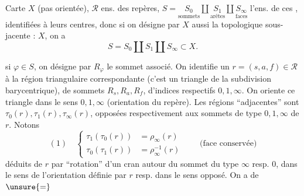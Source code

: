 
Carte $X$ (pas orientée), $\mathcal R$ ens. des repères,
$S=\underset{\text{sommets}}{S_0}\amalg\underset{\text{arêtes}}{S_1}\amalg\underset{\text{faces}}{S_\infty}$
l'ens. de ces , identifiées à  leurs centres, donc si on désigne par $X$ aussi la  topologique sous-jacente : $X$, on a
\[
 S=S_0\amalg S_1\amalg S_\infty\subset X.
\]

si $\varphi\in S$, on désigne par $R_\varphi$ le sommet associé. On identifie un $r=(s,a,f)\in\mathcal R$ à la région triangulaire correspondante (c'est un triangle de la subdivision barycentrique), de sommets $R_s,R_a,R_f$, d'indices respectifs $0,1,\infty$. On oriente ce triangle dans le sens $0,1,\infty$ (orientation du repère). Les régions ``adjacentes'' sont $\tau_0(r),\tau_1(r),\tau_\infty(r)$, opposées respectivement aux sommets de type $0,1,\infty$ de $r$. Notons
\[
 (1)\quad
 \left\{\begin{aligned}
 \tau_1(\tau_0(r))&=\rho_\infty(r)\\
 \tau_0(\tau_1(r))&=\rho_\infty^{-1}(r)
 \end{aligned}\right.
 \qquad\text{(face conservée)}
\]
déduits de $r$ par ``rotation'' d'un cran autour du sommet du type $\infty$ resp. $0$, dans le sens  de l'orientation définie par $r$ resp. dans le sens opposé. On a de $\unsure{=}$

